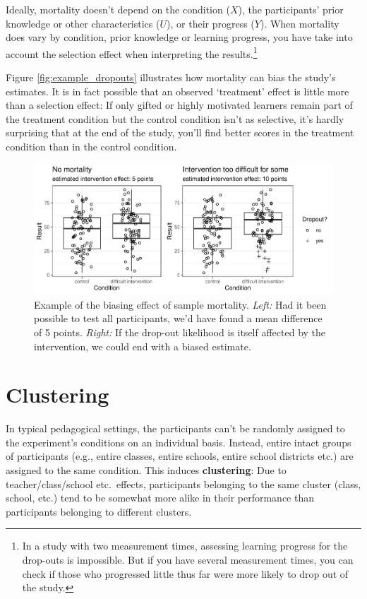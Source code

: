 \documentclass[a4paper]{tufte-book}\usepackage[]{graphicx}\usepackage[]{xcolor}
\begin{document}
Ideally, mortality doesn't depend on the condition ($X$),
the participants' prior knowledge or other characteristics ($U$), or their progress ($Y$).
When mortality does vary by condition, prior knowledge or learning progress,
you have take into account the selection effect when interpreting the results.\footnote{In a study with two measurement times, assessing learning progress for the drop-outs is impossible. But if you have several measurement times, you can check if those who progressed little thus far were more likely to drop out of the study.}

Figure \vref{fig:example_dropouts} illustrates how mortality can bias the study's
estimates. It is in fact possible that an observed `treatment' effect is little
more than a selection effect: If only gifted or highly motivated learners
remain part of the treatment condition but the control condition isn't as selective,
it's hardly surprising that at the end of the study, you'll find better scores
in the treatment condition than in the control condition.





\begin{figure}[tpbh]
  \centering
  \includegraphics[max width = \textwidth]{figure/dropout_effect-1}
  \caption{Example of the biasing effect of sample mortality. \textit{Left:} Had it been possible to test all participants, we'd have found a mean difference of 5 points. \textit{Right:} If the drop-out likelihood is itself affected by the intervention, we could end with a biased estimate.}
  \label{fig:example_dropouts}
\end{figure}

\section{Clustering}\label{sec:clustering}

In typical pedagogical settings, the participants can't be randomly
assigned to the experiment's conditions on an individual basis.
Instead, entire intact groups of participants (e.g., entire classes,
entire schools, entire school districts etc.) are assigned to the same
condition. This induces \textbf{clustering}: Due to teacher/class/school etc.\ effects, participants belonging to the same cluster (class, school, etc.) tend to be somewhat more alike in their performance than participants belonging to different clusters.
\end{document}
